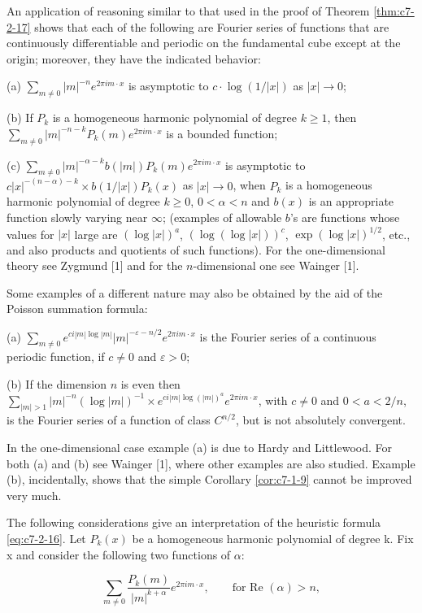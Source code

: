  An application of reasoning similar to that used in the proof of Theorem \ref{thm:c7-2-17} shows that each of the following are Fourier series of functions that are continuously differentiable and periodic on the fundamental cube except at the origin; moreover, they have the indicated behavior:

(a) $\sum_{m \neq 0} |m|^{-n} e^{2\pi im \cdot x}$ is asymptotic to $c \cdot \log (1/|x|)$ as $|x| \to 0$;

(b) If $P_k$ is a homogeneous harmonic polynomial of degree $k \geq 1$, then $\sum_{m \neq 0} |m|^{-n-k}P_k(m)e^{2\pi im \cdot x}$ is a bounded function;

(c) $\sum_{m \neq 0} |m|^{-\alpha-k} b(|m|) P_k(m) e^{2\pi im \cdot x}$ is asymptotic to $c|x|^{-(n-\alpha)-k} \times b(1/|x|) P_k(x)$ as $|x| \to 0$, when $P_k$ is a homogeneous harmonic polynomial of degree $k \geq 0$, $0 < \alpha < n$ and $b(x)$ is an appropriate function slowly varying near $\infty$; (examples of allowable $b$'s are functions whose values for $|x|$ large are $(\log|x|)^a$, $(\log(\log|x|))^c$, $\exp(\log|x|)^{1/2}$, etc., and also products and quotients of such functions). For the one-dimensional theory see Zygmund [1] and for the $n$-dimensional one see Wainger [1].

 Some examples of a different nature may also be obtained by the aid of the Poisson summation formula:

(a) $\sum_{m \neq 0} e^{ci|m|\log|m|}|m|^{-\varepsilon-n/2}e^{2\pi im\cdot x}$ is the Fourier series of a continuous periodic function, if $c \neq 0$ and $\varepsilon > 0$;

(b) If the dimension $n$ is even then $\sum_{|m|>1}|m|^{-n}(\log|m|)^{-1} \times e^{ci|m|\log(|m|)^a}e^{2\pi im \cdot x}$, with $c \neq 0$ and $0 < a < 2/n$, is the Fourier series of a function of class $C^{n/2}$, but is not absolutely convergent.

In the one-dimensional case example (a) is due to Hardy and Littlewood. For both (a) and (b) see Wainger [1], where other examples are also studied. Example (b), incidentally, shows that the simple Corollary \ref{cor:c7-1-9} cannot be improved very much.

 The following considerations give an interpretation of the heuristic formula \eqref{eq:c7-2-16}. Let $P_k(x)$ be a homogeneous harmonic polynomial of degree k. Fix x and consider the following two functions of $\alpha$:

\[
\sum_{m\neq0}\frac{P_{k}(m)}{|m|^{k+\alpha}}e^{2\pi i m\cdot x},\qquad\text{for Re }(\alpha)>n,
\]

